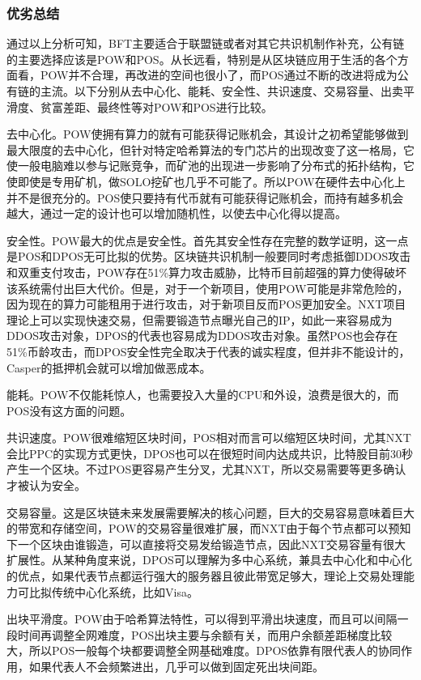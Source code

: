 \documentclass[a4paper,12pt]{article}
\begin{document}
\subsubsection{优劣总结}

通过以上分析可知，BFT主要适合于联盟链或者对其它共识机制作补充，公有链的主要选择应该是POW和POS。从长远看，特别是从区块链应用于生活的各个方面看，POW并不合理，再改进的空间也很小了，而POS通过不断的改进将成为公有链的主流。以下分别从去中心化、能耗、安全性、共识速度、交易容量、出卖平滑度、贫富差距、最终性等对POW和POS进行比较。

去中心化。POW使拥有算力的就有可能获得记账机会，其设计之初希望能够做到最大限度的去中心化，但针对特定哈希算法的专门芯片的出现改变了这一格局，它使一般电脑难以参与记账竞争，而矿池的出现进一步影响了分布式的拓扑结构，它使即使是专用矿机，做SOLO挖矿也几乎不可能了。所以POW在硬件去中心化上并不是很充分的。POS使只要持有代币就有可能获得记账机会，而持有越多机会越大，通过一定的设计也可以增加随机性，以使去中心化得以提高。

安全性。POW最大的优点是安全性。首先其安全性存在完整的数学证明，这一点是POS和DPOS无可比拟的优势。区块链共识机制一般要同时考虑抵御DDOS攻击和双重支付攻击，POW存在51\%算力攻击威胁，比特币目前超强的算力使得破坏该系统需付出巨大代价。但是，对于一个新项目，使用POW可能是非常危险的，因为现在的算力可能租用于进行攻击，对于新项目反而POS更加安全。NXT项目理论上可以实现快速交易，但需要锻造节点曝光自己的IP，如此一来容易成为DDOS攻击对象，DPOS的代表也容易成为DDOS攻击对象。虽然POS也会存在51\%币龄攻击，而DPOS安全性完全取决于代表的诚实程度，但并非不能设计的，Casper的抵押机会就可以增加做恶成本。

能耗。POW不仅能耗惊人，也需要投入大量的CPU和外设，浪费是很大的，而POS没有这方面的问题。

共识速度。POW很难缩短区块时间，POS相对而言可以缩短区块时间，尤其NXT会比PPC的实现方式更快，DPOS也可以在很短时间内达成共识，比特股目前30秒产生一个区块。不过POS更容易产生分叉，尤其NXT，所以交易需要等更多确认才被认为安全。

交易容量。这是区块链未来发展需要解决的核心问题，巨大的交易容易意味着巨大的带宽和存储空间，POW的交易容量很难扩展，而NXT由于每个节点都可以预知下一个区块由谁锻造，可以直接将交易发给锻造节点，因此NXT交易容量有很大扩展性。从某种角度来说，DPOS可以理解为多中心系统，兼具去中心化和中心化的优点，如果代表节点都运行强大的服务器且彼此带宽足够大，理论上交易处理能力可比拟传统中心化系统，比如Visa。

出块平滑度。POW由于哈希算法特性，可以得到平滑出块速度，而且可以间隔一段时间再调整全网难度，POS出块主要与余额有关，而用户余额差距梯度比较大，所以POS一般每个块都要调整全网基础难度。DPOS依靠有限代表人的协同作用，如果代表人不会频繁进出，几乎可以做到固定死出块间距。
\end{document}
